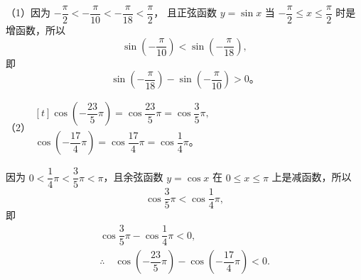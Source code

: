 \jie （1）因为 $-\dfrac \pi 2 < -\dfrac{\pi}{10} < -\dfrac{\pi}{18} < \dfrac \pi 2$，\vspace{0.5em}
且正弦函数 $y = \sin x$ 当 $-\dfrac \pi 2 \leqslant x \leqslant \dfrac \pi 2$ 时是增函数，所以
$$ \sin\left( -\dfrac{\pi}{10} \right) < \sin\left( -\dfrac{\pi}{18} \right) ,$$
即
$$\sin\left( -\dfrac{\pi}{18} \right) - \sin\left( -\dfrac{\pi}{10} \right) > 0 \text{。}$$

（2）$\begin{gathered}[t]
    \cos\left( -\dfrac{23}{5} \pi \right) = \cos \dfrac{23}{5} \pi = \cos \dfrac 3 5 \pi, \\
    \cos\left( -\dfrac{17}{4} \pi \right) = \cos \dfrac{17}{4} \pi = \cos \dfrac 1 4 \pi \text{。}
\end{gathered}$

因为 $0 < \dfrac 1 4 \pi < \dfrac 3 5 \pi < \pi$，且余弦函数 $y = \cos x$ 在
$0 \leqslant x \leqslant \pi$ 上是减函数，所以
$$ \cos \dfrac 3 5 \pi < \cos \dfrac 1 4 \pi , $$
即
$$\begin{gathered}
    \cos \dfrac 3 5 \pi - \cos \dfrac 1 4 \pi < 0, \\
    \therefore \quad \cos\left( -\dfrac{23}{5} \pi \right) - \cos\left( -\dfrac{17}{4} \pi \right) < 0 .
\end{gathered}$$

